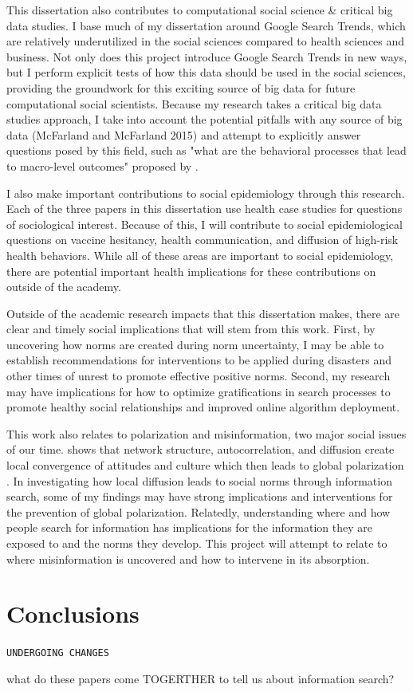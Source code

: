 This dissertation also contributes to computational social science \&
critical big data studies. I base much of my dissertation around Google
Search Trends, which are relatively underutilized in the social sciences
compared to health sciences and business. Not only does this project
introduce Google Search Trends in new ways, but I perform explicit tests
of how this data should be used in the social sciences, providing the
groundwork for this exciting source of big data for future computational
social scientists. Because my research takes a critical big data studies
approach, I take into account the potential pitfalls with any source of
big data (McFarland and McFarland 2015) and attempt to explicitly answer
questions posed by this field, such as "what are the behavioral
processes that lead to macro-level outcomes" proposed by \citet{breigerScaling2015}.

I also make important contributions to social epidemiology through this
research. Each of the three papers in this dissertation use health case
studies for questions of sociological interest. Because of this, I will
contribute to social epidemiological questions on vaccine hesitancy,
health communication, and diffusion of high-risk health behaviors. While
all of these areas are important to social epidemiology, there are
potential important health implications for these contributions on
outside of the academy.

Outside of the academic research impacts that this dissertation makes,
there are clear and timely social implications that will stem from this
work. First, by uncovering how norms are created during norm
uncertainty, I may be able to establish recommendations for
interventions to be applied during disasters and other times of unrest
to promote effective positive norms. Second, my research may have
implications for how to optimize gratifications in search processes to
promote healthy social relationships and improved online algorithm
deployment.

This work also relates to polarization and misinformation, two major
social issues of our time. \citet{axelrodDisseminationCultureModel1997} shows that network structure,
autocorrelation, and diffusion create local convergence of attitudes and
culture which then leads to global polarization \citep{dellapostaWhyLiberalsDrink2015}. In investigating how local diffusion leads to social norms
through information search, some of my findings may have strong
implications and interventions for the prevention of global
polarization. Relatedly, understanding where and how people search for
information has implications for the information they are exposed to and
the norms they develop. This project will attempt to relate to where
misinformation is uncovered and how to intervene in its absorption.


\section{Conclusions}
\begin{center}
    \texttt{UNDERGOING CHANGES}
\end{center}


what do these papers come TOGERTHER to tell us about information search?
